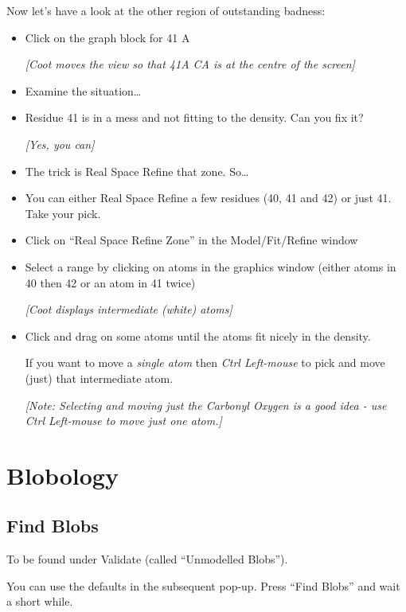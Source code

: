 \documentclass{article}
\begin{document}
Now let's have a look at the other region of outstanding badness:
\begin{itemize}
\item Click on the graph block for 41 A

\textsl{ [Coot moves the view so that 41A CA is at the centre of the screen]}

\item Examine the situation\ldots
\item Residue 41 is in a mess and not fitting to the density.  Can you
  fix it?

  \emph{ [Yes, you can] } 
\item The trick is Real Space Refine that zone. So\ldots
\item You can either Real Space Refine a few residues (40, 41 and 42)
  or just 41.  Take your pick.
\item Click on \textsf{``Real Space Refine Zone''} in the
  Model/Fit/Refine window
\item Select a range by clicking on atoms in the graphics window
  (either atoms in 40 then 42 or an atom in 41 twice)

\textsl{[Coot displays intermediate (white) atoms]}

\item Click and drag on some atoms until the atoms fit nicely in the
  density.  

  If you want to move a \emph{single atom} then \emph{Ctrl Left-mouse}
  to pick and move (just) that intermediate atom.
  
  \emph{[Note: Selecting and moving just the Carbonyl Oxygen is a
    good idea - use Ctrl Left-mouse to move just one atom.]}

\end{itemize}


\section{Blobology}

\subsection{Find Blobs}
To be found under Validate (called ``Unmodelled Blobs'').  


You can use the defaults in the subsequent pop-up. Press ``Find Blobs''
and wait a short while.
\end{document}
